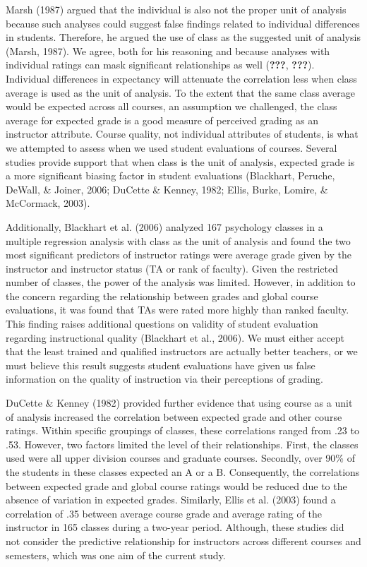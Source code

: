\documentclass[,man]{apa6}
\theoremstyle{definition}
\theoremstyle{definition}
\theoremstyle{definition}
\theoremstyle{remark}
\begin{document}
Marsh (1987) argued that the individual is also not the proper unit of
analysis because such analyses could suggest false findings related to
individual differences in students. Therefore, he argued the use of
class as the suggested unit of analysis (Marsh, 1987). We agree, both
for his reasoning and because analyses with individual ratings can mask
significant relationships as well ({\textbf{???}}, {\textbf{???}}).
Individual differences in expectancy will attenuate the correlation less
when class average is used as the unit of analysis. To the extent that
the same class average would be expected across all courses, an
assumption we challenged, the class average for expected grade is a good
measure of perceived grading as an instructor attribute. Course quality,
not individual attributes of students, is what we attempted to assess
when we used student evaluations of courses. Several studies provide
support that when class is the unit of analysis, expected grade is a
more significant biasing factor in student evaluations (Blackhart,
Peruche, DeWall, \& Joiner, 2006; DuCette \& Kenney, 1982; Ellis, Burke,
Lomire, \& McCormack, 2003).

Additionally, Blackhart et al. (2006) analyzed 167 psychology classes in
a multiple regression analysis with class as the unit of analysis and
found the two most significant predictors of instructor ratings were
average grade given by the instructor and instructor status (TA or rank
of faculty). Given the restricted number of classes, the power of the
analysis was limited. However, in addition to the concern regarding the
relationship between grades and global course evaluations, it was found
that TAs were rated more highly than ranked faculty. This finding raises
additional questions on validity of student evaluation regarding
instructional quality (Blackhart et al., 2006). We must either accept
that the least trained and qualified instructors are actually better
teachers, or we must believe this result suggests student evaluations
have given us false information on the quality of instruction via their
perceptions of grading.

DuCette \& Kenney (1982) provided further evidence that using course as
a unit of analysis increased the correlation between expected grade and
other course ratings. Within specific groupings of classes, these
correlations ranged from .23 to .53. However, two factors limited the
level of their relationships. First, the classes used were all upper
division courses and graduate courses. Secondly, over 90\% of the
students in these classes expected an A or a B. Consequently, the
correlations between expected grade and global course ratings would be
reduced due to the absence of variation in expected grades. Similarly,
Ellis et al. (2003) found a correlation of .35 between average course
grade and average rating of the instructor in 165 classes during a
two-year period. Although, these studies did not consider the predictive
relationship for instructors across different courses and semesters,
which was one aim of the current study.
\end{document}
